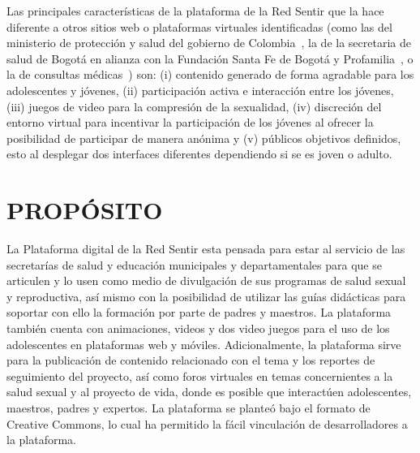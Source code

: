 \documentclass[journal,transmag]{IEEEtran}
\begin{document}
Las principales características de la plataforma de la Red Sentir que la hace diferente a otros sitios web o plataformas virtuales identificadas (como las del ministerio de protección y salud del gobierno de Colombia~\cite{PagGob2018}, la de la secretaria de salud de Bogotá en alianza con la Fundación Santa Fe de Bogotá y Profamilia~\cite{Sexperto2018}, o la de consultas médicas~\cite{1DOC3}) son: (i) contenido generado de forma agradable para los adolescentes y jóvenes, (ii) participación activa e interacción entre los jóvenes, (iii) juegos de video para la compresión de la sexualidad, (iv) discreción del entorno virtual para incentivar la participación de los jóvenes al ofrecer la posibilidad de participar de manera anónima y (v) públicos objetivos definidos, esto al desplegar dos interfaces diferentes dependiendo si se es joven o adulto.  


\section{PROPÓSITO}\label{sec:propositos}

La Plataforma digital de la Red Sentir esta pensada para estar al servicio de las secretarías de salud y educación municipales y departamentales para que se articulen y lo usen como medio de divulgación de sus programas de salud sexual y reproductiva, así mismo con la posibilidad de utilizar las guías didácticas para soportar con ello la formación por parte de padres y maestros. La plataforma también cuenta con animaciones, videos y dos video juegos para el uso de los adolescentes en plataformas web y móviles. Adicionalmente, la plataforma sirve para la publicación de contenido relacionado con el tema y los reportes de seguimiento del proyecto, así como foros virtuales en temas concernientes a la salud sexual y al proyecto de vida, donde es posible que interactúen adolescentes, maestros, padres y expertos. La plataforma se planteó bajo el formato de Creative Commons, lo cual ha permitido la fácil vinculación de desarrolladores a la plataforma.
\end{document}
